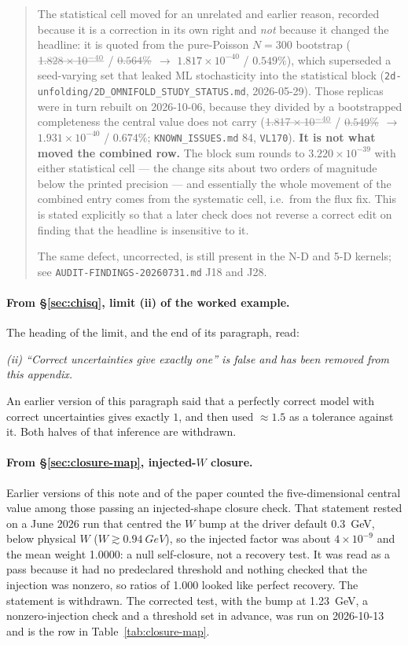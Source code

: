 \begin{quote}
The statistical cell moved for an unrelated and earlier reason, recorded because it is a correction in its own right and \emph{not} because it changed the headline: it is quoted from the pure-Poisson $N=300$ bootstrap ($\dead{1.828\times10^{-40}}$ / $\dead{0.564\%}$ $\to$ $1.817\times10^{-40}$ / $0.549\%$), which superseded a seed-varying set that leaked ML stochasticity into the statistical block (\texttt{2d-unfolding/2D\_OMNIFOLD\_STUDY\_STATUS.md}, 2026-05-29). Those replicas were in turn rebuilt on 2026-10-06, because they divided by a bootstrapped completeness the central value does not carry ($\dead{1.817\times10^{-40}}$ / $\dead{0.549\%}$ $\to$ $1.931\times10^{-40}$ / $0.674\%$; \texttt{KNOWN\_ISSUES.md} 84, \texttt{VL170}). \textbf{It is not what moved the combined row.} The block sum rounds to $3.220\times10^{-39}$ with either statistical cell --- the change sits about two orders of magnitude below the printed precision --- and essentially the whole movement of the combined entry comes from the systematic cell, i.e.\ from the flux fix. This is stated explicitly so that a later check does not reverse a correct edit on finding that the headline is insensitive to it.

The same defect, uncorrected, is still present in the N-D and 5-D kernels; see \texttt{AUDIT-FINDINGS-20260731.md} J18 and J28.
\end{quote}

\paragraph{From \S\ref{sec:chisq}, limit (ii) of the worked example.} The heading of the limit, and the end of its paragraph, read:

\emph{(ii) ``Correct uncertainties give exactly one'' is false and has been removed from this appendix.}

An earlier version of this paragraph said that a perfectly correct model with correct uncertainties gives exactly $1$, and then used $\approx1.5$ as a tolerance against it. Both halves of that inference are withdrawn.

\paragraph{From \S\ref{sec:closure-map}, injected-$W$ closure.} Earlier versions of this note and of the paper counted the five-dimensional central value among those passing an injected-shape closure check. That statement rested on a June 2026 run that centred the $W$ bump at the driver default \SI{0.3}{GeV}, below physical $W$ ($W\gtrsim\SI{0.94}{GeV}$), so the injected factor was about $4\times10^{-9}$ and the mean weight 1.0000: a null self-closure, not a recovery test. It was read as a pass because it had no predeclared threshold and nothing checked that the injection was nonzero, so ratios of 1.000 looked like perfect recovery. The statement is withdrawn. The corrected test, with the bump at \SI{1.23}{GeV}, a nonzero-injection check and a threshold set in advance, was run on 2026-10-13 and is the row in Table~\ref{tab:closure-map}.

